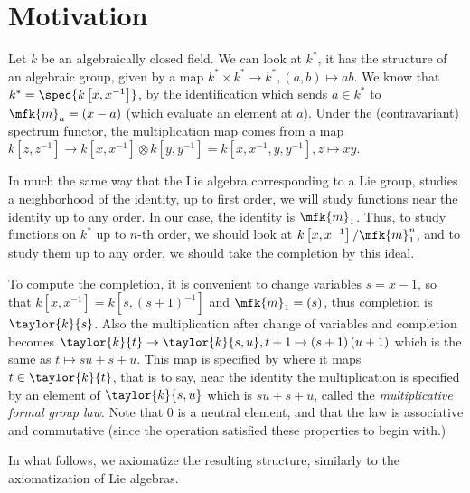 \section{Motivation}

Let $k$ be an algebraically closed field.
We can look at $k^*$, it has the structure of an algebraic group, given by a map
$
	k^* \times k^* \to k^*,
	\left(a,b\right) \mapsto ab
$.
We know that $k^* = \spec{k\left[x,x^{-1}\right]}$, by the identification which sends $a \in k^*$ to $\mfk{m}_a = \left(x-a\right)$ (which evaluate an element at $a$). Under the (contravariant) spectrum functor, the multiplication map comes from a map
$
	k\left[z,z^{-1}\right]
	\to
	k\left[x,x^{-1}\right] \otimes k\left[y,y^{-1}\right]
	= k\left[x,x^{-1},y,y^{-1}\right]
	,
	z \mapsto xy
$.

In much the same way that the Lie algebra corresponding to a Lie group, studies a neighborhood of the identity, up to first order,
we will study functions near the identity up to any order.
In our case, the identity is $\mfk{m}_1$.
Thus, to study functions on $k^*$ up to $n$-th order, we should look at $k\left[x,x^{-1}\right] / \mfk{m}_1^n$, and to study them up to any order, we should take the completion by this ideal.

To compute the completion, it is convenient to change variables $s = x-1$, so that $k\left[x,x^{-1}\right] = k\left[s,\left(s+1\right)^{-1}\right]$ and $\mfk{m}_1 = \left(s\right)$, thus completion is $\taylor{k}{s}$.
Also the multiplication after change of variables and completion becomes
$
	\taylor{k}{t}
	\to
	\taylor{k}{s,u},
	t+1 \mapsto \left(s+1\right)\left(u+1\right)
$
which is the same as $t \mapsto su+s+u$.
This map is specified by where it maps $t \in \taylor{k}{t}$,
that is to say, near the identity the multiplication is specified by an element of $\taylor{k}{s,u}$ which is $su+s+u$, called the \emph{multiplicative formal group law}.
Note that $0$ is a neutral element, and that the law is associative and commutative (since the operation satisfied these properties to begin with.)

In what follows, we axiomatize the resulting structure, similarly to the axiomatization of Lie algebras.